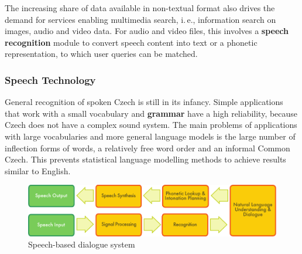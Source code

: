 \begin{multicols}{2}
The increasing share of data available in non-textual format also drives the demand for services enabling multimedia search, i.\,e., information search on images, audio and video data. For audio and video files, this involves a \textbf{speech recognition} module to convert speech content into text or a phonetic representation, to which user queries can be matched.  
  
\subsubsection{Speech Technology}

General recognition of spoken Czech is still in its infancy. Simple applications that work with a small vocabulary and \textbf{grammar} have a high reliability, because Czech does not have a complex sound system. The main problems of applications with large vocabularies and more general language models is the large number of inflection forms of words, a relatively free word order and an informal Common Czech. This prevents statistical language modelling methods to achieve results similar to English.

 \begin{figure}[htb]
  \center
  \includegraphics[width=\textwidth]{../_media/english/simple_speech-based_dialogue_architecture}
  \caption{Speech-based dialogue system}
\label{fig:dialoguearch_en}
\end{figure}


\end{multicols}

